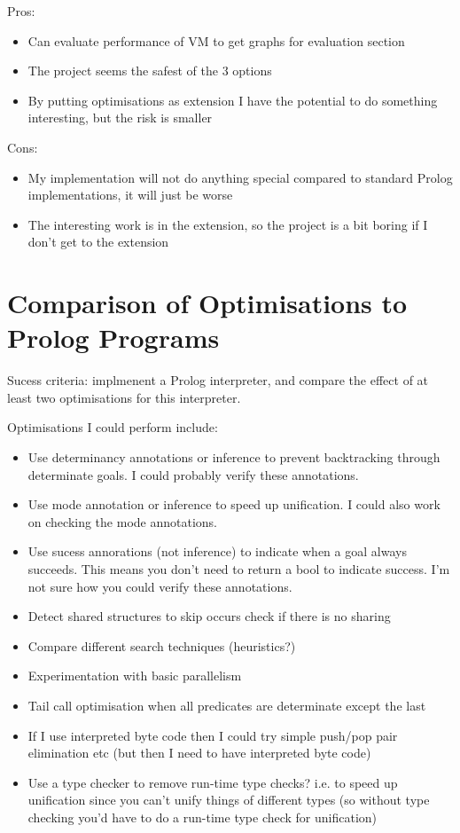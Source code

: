 \documentclass{article}
\begin{document}
Pros:
\begin{itemize}
\item Can evaluate performance of VM to get graphs for evaluation section
\item The project seems the safest of the 3 options
\item By putting optimisations as extension I have the potential to do something interesting, but the risk is smaller
\end{itemize}

Cons:
\begin{itemize}
\item My implementation will not do anything special compared to standard Prolog implementations, it will just be worse
\item The interesting work is in the extension, so the project is a bit boring if I don't get to the extension
\end{itemize}

\section{Comparison of Optimisations to Prolog Programs}

Sucess criteria: implmenent a Prolog interpreter, and compare the effect of at least two optimisations for this interpreter.

Optimisations I could perform include:
\begin{itemize}
\item Use determinancy annotations or inference to prevent backtracking through determinate goals. I could probably verify these annotations.
\item Use mode annotation or inference to speed up unification. I could also work on checking the mode annotations.
\item Use sucess annorations (not inference) to indicate when a  goal always succeeds. This means you don't need to return a bool to indicate success. I'm not sure how you could verify these annotations.
\item Detect shared structures to skip occurs check if there is no sharing 
\item Compare different search techniques (heuristics?)
\item Experimentation with basic parallelism
\item Tail call optimisation when all predicates are determinate except the last
\item If I use interpreted byte code then I could try simple push/pop pair elimination etc (but then I need to have interpreted byte code)
\item Use a type checker to remove run-time type checks? i.e. to speed up unification since you can't unify things of different types (so without type checking you'd have to do a run-time type check for unification)
\end{itemize}
\end{document}
